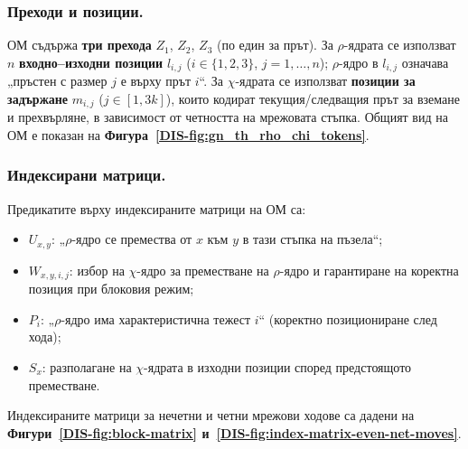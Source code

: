 \subsubsection*{Преходи и позиции.}
\vspace{-0.1cm}
\hspace*{2.5em}ОМ съдържа \textbf{три прехода} \(Z_1\), \(Z_2\), \(Z_3\) (по един за прът). За \(\rho\)-ядрата се използват \(n\) \textbf{входно--изходни позиции} \(l_{i,j}\) (\(i\in\{1,2,3\}\), \(j=1,\dots,n\)); \(\rho\)-ядро в \(l_{i,j}\) означава „пръстен с размер \(j\) е върху прът \(i\)“. За \(\chi\)-ядрата се използват \textbf{позиции за задържане} \(m_{i,j}\) (\(j\in[1,3k]\)), които кодират текущия/следващия прът за вземане и прехвърляне, в зависимост от четността на мрежовата стъпка. Общият вид на ОМ е показан на \textbf{Фигура~\ref{DIS-fig:gn_th_rho_chi_tokens}}.

\subsubsection*{Индексирани матрици.}
\vspace{-0.1cm}
\hspace*{2.5em}Предикатите върху индексираните матрици на ОМ са:
\vspace{-0.2cm}
\begin{itemize}
	\item \(U_{x,y}\): „\(\rho\)-ядро се премества от \(x\) към \(y\) в тази стъпка на пъзела“;
	\item \(W_{x,y,i,j}\): избор на \(\chi\)-ядро за преместване на \(\rho\)-ядро и гарантиране на коректна позиция при блоковия режим;
	\item \(P_i\): „\(\rho\)-ядро има характеристична тежест \(i\)“ (коректно позициониране след хода);
	\item \(S_x\): разполагане на \(\chi\)-ядрата в изходни позиции според предстоящото преместване.
\end{itemize}
\hspace*{2.5em}Индексираните матрици за нечетни и четни мрежови ходове са дадени на \textbf{Фигури~\ref{DIS-fig:block-matrix} и~\ref{DIS-fig:index-matrix-even-net-moves}}.

